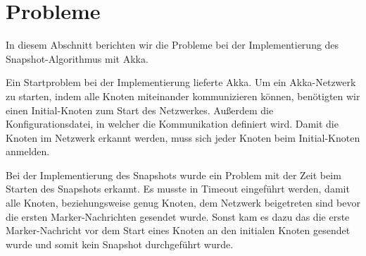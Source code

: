 \section{Probleme}
\label{sec:probs}
In diesem Abschnitt berichten wir die Probleme bei der Implementierung des
Snapshot-Algorithmus mit Akka.

Ein Startproblem bei der Implementierung lieferte Akka.
Um ein Akka-Netzwerk zu starten, indem alle Knoten miteinander kommunizieren
können, benötigten wir einen Initial-Knoten zum Start des Netzwerkes.
Außerdem die Konfigurationsdatei, in welcher die Kommunikation definiert wird.
Damit die Knoten im Netzwerk erkannt werden, muss sich jeder Knoten beim
Initial-Knoten anmelden.

Bei der Implementierung des Snapshots wurde ein Problem mit der Zeit beim 
Starten des Snapshots erkannt.
Es musste in Timeout eingeführt werden, damit alle Knoten, beziehungsweise
genug Knoten, dem Netzwerk beigetreten sind bevor die ersten Marker-Nachrichten
gesendet wurde.
Sonst kam es dazu das die erste Marker-Nachricht vor dem Start eines Knoten an
den initialen Knoten gesendet wurde und somit kein Snapshot durchgeführt wurde.
